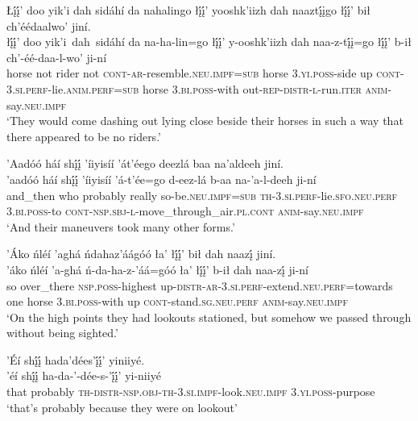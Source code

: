 \ea\label{ex:text2-17-3}
Łį́į́’ doo yik’i dah sidáhí da nahalingo łį́į́’ yooshk’iizh dah naaztį́įgo łį́į́’ bił ch’éédaalwo’ jiní.\\
\gll łį́į́’	doo	yik’i~dah~{sidáhí}	da	na-ha-lin=go	łį́į́’	y-ooshk’iizh	dah	naa-z-tį́į=go	łį́į́’	b-ił	ch’-éé-daa-l-wo’	ji-ní\\
     horse	not	rider	not	\textsc{cont}-\textsc{ar}-resemble.\textsc{neu}.\textsc{impf}=\textsc{sub}	horse	3.\textsc{yi}.\textsc{poss}-side	up	\textsc{cont}-3.\textsc{si}.\textsc{perf}-lie.\textsc{anim}.\textsc{perf}=\textsc{sub}	horse	3.\textsc{bi}.\textsc{poss}-with	out-\textsc{rep}-\textsc{distr}-\textsc{l}-run.\textsc{iter}	\textsc{anim}-say.\textsc{neu}.\textsc{impf}\\
\glt `They would come dashing out lying close beside their horses in such a way that there appeared to be no riders.'
\z

\ea\label{ex:text2-17-4}
’Aadóó háí shį́į́ ’íiyisíí ’át’éego deezlá baa na’aldeeh jiní.\\
\gll ’aadóó	háí	shį́į́	’íiyisíí	’á-t’ée=go	d-eez-lá	b-aa	na-’a-l-deeh	ji-ní\\
     and\_then	who	probably	really	so-be.\textsc{neu}.\textsc{impf}=\textsc{sub}	\textsc{th}-3.\textsc{si}.\textsc{perf}-lie.\textsc{sfo}.\textsc{neu}.\textsc{perf}	3.\textsc{bi}.\textsc{poss}-to	\textsc{cont}-\textsc{nsp}.\textsc{sbj}-\textsc{l}-move\_through\_air.\textsc{pl}.\textsc{cont}	\textsc{anim}-say.\textsc{neu}.\textsc{impf}\\
\glt `And their maneuvers took many other forms.'
\z

\ea\label{ex:text2-17-5}
’Áko ńléí ’aghá ńdahaz’áágóó ła’ łį́į́’ bił dah naazį́ jiní.\\
\gll ’áko	ńléí	’a-ghá	ń-da-ha-z-’áá=góó	ła’	łį́į́’	b-ił	dah	naa-zį́	ji-ní\\
     so	over\_there	\textsc{nsp}.\textsc{poss}-highest	up-\textsc{distr}-\textsc{ar}-3.\textsc{si}.\textsc{perf}-extend.\textsc{neu}.\textsc{perf}=towards	one	horse	3.\textsc{bi}.\textsc{poss}-with	up	\textsc{cont}-stand.\textsc{sg}.\textsc{neu}.\textsc{perf}	\textsc{anim}-say.\textsc{neu}.\textsc{impf}\\
\glt `On the high points they had lookouts stationed, but somehow we passed through without being sighted.'
\z

\newpage
\ea\label{ex:text2-17-6}
’Éí shį́į́ hada’dées’į́į́’ yiniiyé.\\
\gll ’éí	shį́į́	ha-da-’-dée-s-’į́į́’	yi-niiyé\\
     that	probably	\textsc{th}-\textsc{distr}-\textsc{nsp}.\textsc{obj}-\textsc{th}-3.\textsc{si}.\textsc{impf}-look.\textsc{neu}.\textsc{impf}	3.\textsc{yi}.\textsc{poss}-purpose\\
\glt `that's probably because they were on lookout'
\z

